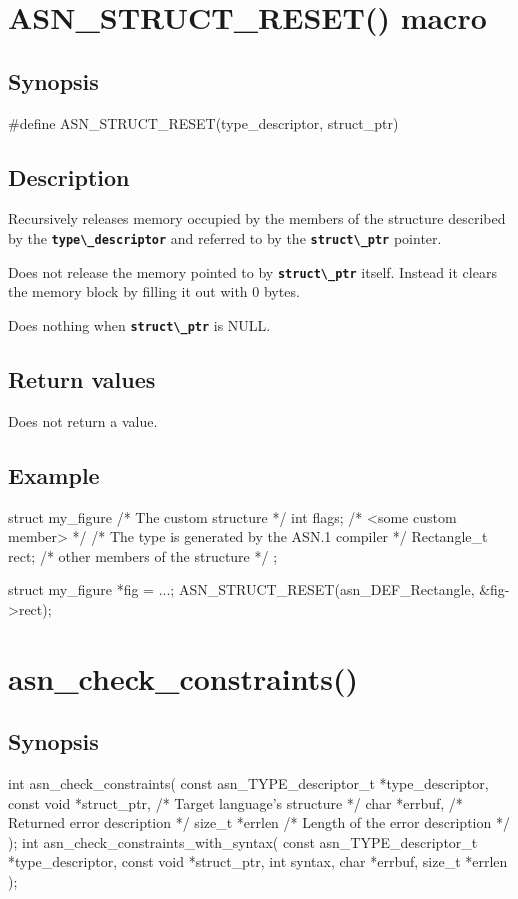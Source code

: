 \documentclass[english,oneside,12pt]{book}
\newcommand{\apisection}[2]{\clearpage\section{\label{#1}#2}}
\newcommand{\code}[1]{\texttt{\textbf{\lstinline{#1}}}}
\begin{document}
\apisection{sec:ASN_STRUCT_RESET}{ASN\_STRUCT\_RESET() macro}

\subsection*{Synopsis}

\begin{signature}
#define ASN_STRUCT_RESET(type_descriptor, struct_ptr)
\end{signature}

\subsection*{Description}

Recursively releases memory occupied by the members of the structure
described by the \code{type\_descriptor} and referred to
by the \code{struct\_ptr} pointer.

Does not release the memory pointed to by \code{struct\_ptr} itself.
Instead it clears the memory block by filling it out with 0 bytes.

Does nothing when \code{struct\_ptr} is NULL.

\subsection*{Return values}
Does not return a value.

\subsection*{Example}

\begin{example}
struct my_figure {       /* The custom structure */
    int flags;           /* <some custom member> */
    /* The type is generated by the ASN.1 compiler */
    Rectangle_t rect;
    /* other members of the structure */
};

struct my_figure *fig = ...;
ASN_STRUCT_RESET(asn_DEF_Rectangle, &fig->rect);
\end{example}

\apisection{sec:asn_check_constraints}{asn\_check\_constraints()}

\subsection*{Synopsis}

\begin{signature}
int asn_check_constraints(
    const asn_TYPE_descriptor_t *type_descriptor,
    const void *struct_ptr, /* Target language's structure */
    char *errbuf,           /* Returned error description */
    size_t *errlen          /* Length of the error description */
);
int asn_check_constraints_with_syntax(
    const asn_TYPE_descriptor_t *type_descriptor,
    const void *struct_ptr,
    int syntax, char *errbuf, size_t *errlen
);
\end{signature}
\end{document}
